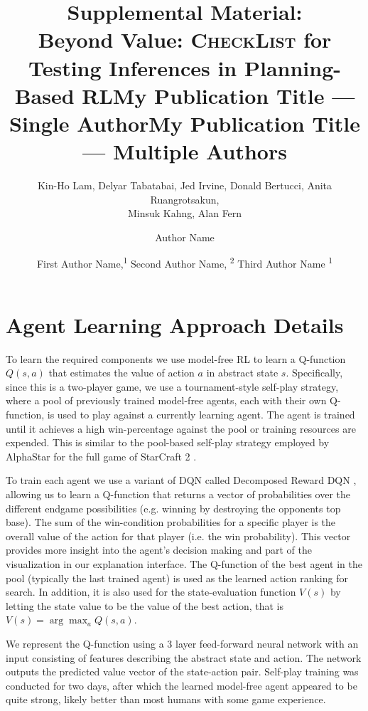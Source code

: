 \documentclass[letterpaper]{article} %
\title{Supplemental Material:\\
Beyond Value: \textsc{CheckList} for Testing Inferences in Planning-Based RL}
\author {
    Kin-Ho Lam, %
     Delyar Tabatabai, %
     Jed Irvine,
     Donald Bertucci,
     Anita Ruangrotsakun,\\
     Minsuk Kahng,
     Alan Fern
}
\title{My Publication Title --- Single Author}
\author {
    Author Name
}
\title{My Publication Title --- Multiple Authors}
\author {
    First Author Name,\textsuperscript{\rm 1}
    Second Author Name, \textsuperscript{\rm 2}
    Third Author Name \textsuperscript{\rm 1}
}
\begin{document}
\maketitle




\section{Agent Learning Approach Details}


To learn the required components we use model-free RL to learn a Q-function $Q(s,a)$ that estimates the value of action $a$ in abstract state $s$. 
Specifically, since this is a two-player game, we use a tournament-style self-play strategy, where a pool of previously trained model-free agents, each with their own Q-function, is used to play against a currently learning agent. The agent is trained until it achieves a high win-percentage against the pool or training resources are expended. This is similar to the pool-based self-play strategy employed by AlphaStar for the full game of StarCraft 2 \cite{vinyals2019}. 

To train each agent we use a variant of DQN \cite{mnih2015} called Decomposed Reward DQN \cite{juozapaitis2019}, allowing us to learn a Q-function that returns a vector of probabilities over the different endgame possibilities (e.g. winning by destroying the opponents top base). The sum of the win-condition probabilities for a specific player is the overall value of the action for that player (i.e. the win probability). This vector provides more insight into the agent's decision making and part of the visualization in our explanation interface. The Q-function of the best agent in the pool (typically the last trained agent) is used as the learned action ranking for search. In addition, it is also used for the state-evaluation function $V(s)$ by letting the state value to be the value of the best action, that is $V(s) = \arg\max_a Q(s,a)$.

We represent the Q-function using a 3 layer feed-forward neural network with an input consisting of features describing the abstract state and action. The network outputs the predicted value vector of the state-action pair. Self-play training was conducted for two days, after which the learned model-free agent appeared to be quite strong, likely better than most humans with some game experience.
\end{document}
